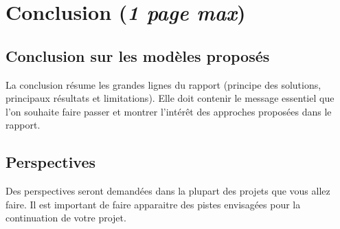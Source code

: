 
\chapter{Conclusion (\textit{1 page max})}
\label{ch:Conclusion} 

\section{Conclusion sur les modèles proposés}
La conclusion résume les grandes lignes du rapport (principe des solutions, principaux résultats et limitations). Elle doit contenir le message essentiel que l’on souhaite faire passer et montrer l’intérêt des approches proposées dans le rapport.

\section{Perspectives}
Des perspectives seront demandées dans la plupart des projets que vous allez faire. Il est important de faire apparaitre des pistes envisagées pour la continuation de votre projet.

